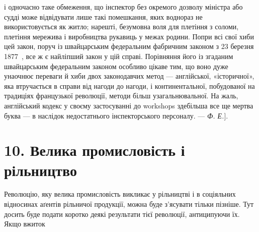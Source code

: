 {і одночасно таке обмеження, що інспектор без окремого дозволу міністра
або судді може відвідувати лише такі помешкання, яких воднораз не
використовується як житло; нарешті, безумовна воля для плетіння з
соломи, плетіння мережива і виробництва рукавиць у межах родини.
Попри всі свої хиби цей закон, поруч із швайцарським федеральним
фабричним законом з 23 березня 1877~, все ж є найліпший закон у цій
справі. Порівняння його із згаданим швайцарським федеральним законом
особливо цікаве тим, що воно дуже унаочнює переваги й хиби двох законодавчих
метод — англійської, «історичної», яка втручається в справи
від нагоди до нагоди, і континентальної, побудованої на традиціях французької
революції, методи більш узагальнювальної. На жаль, англійський
кодекс у своєму застосуванні до workshops здебільша все ще мертва
буква — в наслідок недостатнього інспекторського персоналу. — \emph{Ф. Е.}].
}

\section*{10. Велика промисловість і рільництво}

Революцію, яку велика промисловість викликає у рільництві
і в соціяльних відносинах аґентів рільничої продукції, можна
буде з’ясувати тільки пізніше. Тут досить буде подати коротко
деякі результати тієї революції, антиципуючи їх. Якщо вжиток
\parbreak{}  %
